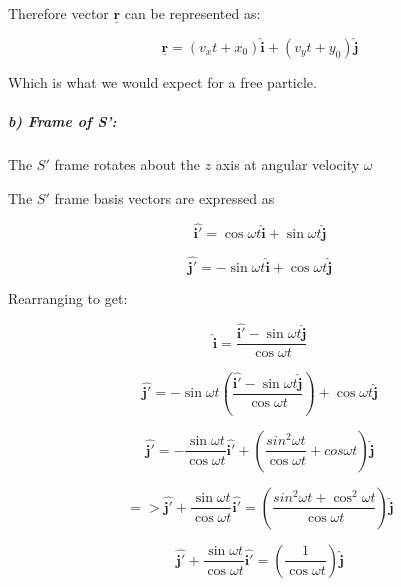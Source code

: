 \documentclass[a4paper,11pt]{scrartcl}
\begin{document}
Therefore vector $\underline{\mathbf{r}}$ can be represented as:

\begin{equation}
\underline{\mathbf{r}}=(v_xt+x_0)\hat{\mathbf{i}}+\left(v_yt+y_0\right)\hat{\mathbf{j}}
\end{equation}

Which is what we would expect for a free particle. 

\subparagraph{b) Frame of S':}


The $S'$ frame rotates about the $z$ axis at angular velocity $\omega$ 

The $S'$ frame basis vectors are expressed as 

 
\begin{equation}
\hat{\mathbf{i'}} = \cos{\omega}t\hat{\mathbf{i}}+\sin{\omega}t\hat{\mathbf{j}}
\end{equation}

\begin{equation}
\hat{\mathbf{j'}} = -\sin{\omega}t\hat{\mathbf{i}}+\cos{\omega}t\hat{\mathbf{j}}
\end{equation}

Rearranging to get:

\begin{equation}
\hat{\mathbf{i}} =\frac{\hat{\mathbf{i'}}-\sin{\omega}t\hat{\mathbf{j}}}{ \cos{\omega}t}
\end{equation}

\begin{equation}
\hat{\mathbf{j'}} = -\sin{\omega}t\left(\frac{\hat{\mathbf{i'}}-\sin{\omega}t\hat{\mathbf{\mathbf{j}}}}{ \cos{\omega}t}\right)+\cos{\omega}t\hat{\mathbf{j}}
\end{equation}

\begin{equation}
\hat{\mathbf{j'}} = -\frac{ \sin{\omega}t }{\cos{\omega}t}\hat{\mathbf{i'}}+\left(\frac{sin^2{\omega}t}{\cos{\omega}t}+cos{\omega}t\right)\hat{\mathbf{j}}
\end{equation}

\begin{equation}
=>\hat{\mathbf{j'}} +\frac{ \sin{\omega}t }{\cos{\omega}t}\hat{\mathbf{i'}}=\left(\frac{sin^2{\omega}t+\cos^2{\omega}t}{\cos{\omega}t}\right)\hat{\mathbf{j}}
\end{equation}

\begin{equation}
\hat{\mathbf{j'}} +\frac{ \sin{\omega}t}{\cos{\omega}t}\hat{\mathbf{i'}}=\left(\frac{1}{\cos{\omega}t}\right)\hat{\mathbf{j}}
\end{equation}
\end{document}
